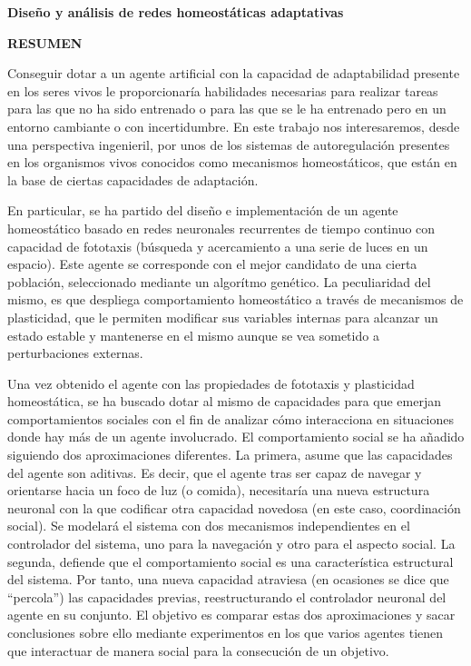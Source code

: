 \begin{center}
{\Large \bfseries Diseño y análisis de redes homeostáticas adaptativas}

\vspace{1cm}
{\Large \bfseries RESUMEN}

\vspace{1.5cm}
\end{center}

Conseguir dotar a un agente artificial con la capacidad de adaptabilidad presente en los seres vivos le proporcionaría habilidades necesarias para realizar tareas para las que no ha sido entrenado o
para las que se le ha entrenado pero en un entorno cambiante o con incertidumbre. En este trabajo nos interesaremos, desde una perspectiva ingenieril, por unos de los sistemas de autoregulación presentes
en los organismos vivos conocidos como mecanismos homeostáticos, que están en la base de ciertas capacidades de adaptación.

En particular, se ha partido del diseño e implementación de un agente homeostático basado en redes neuronales recurrentes de tiempo continuo con capacidad de fototaxis (búsqueda y acercamiento a una serie de luces en un espacio).
Este agente se corresponde con el mejor candidato de una cierta población, seleccionado mediante un algorítmo genético. La peculiaridad del mismo, es que despliega comportamiento homeostático a través de mecanismos de plasticidad,
que le permiten modificar sus variables internas para alcanzar un estado estable y mantenerse en el mismo aunque se vea sometido a perturbaciones externas.

Una vez obtenido el agente con las propiedades de fototaxis y plasticidad homeostática, se ha buscado dotar al mismo de capacidades para que emerjan comportamientos sociales con el fin de analizar cómo interacciona en situaciones donde hay más de un agente
involucrado. El comportamiento social se ha añadido siguiendo dos aproximaciones diferentes. La primera, asume que las capacidades del agente son aditivas. Es decir, que el agente tras ser capaz de navegar y orientarse
hacia un foco de luz (o comida), necesitaría una nueva estructura neuronal con la que codificar otra capacidad novedosa (en este caso, coordinación social). Se modelará el sistema con dos mecanismos independientes en el controlador
del sistema, uno para la navegación y otro para el aspecto social. La segunda, defiende que el comportamiento social es una característica estructural del sistema. Por tanto, una nueva capacidad atraviesa (en ocasiones se
dice que ``percola'') las capacidades previas, reestructurando el controlador neuronal del agente en su conjunto. El objetivo es comparar estas dos aproximaciones y sacar conclusiones sobre ello mediante experimentos en los que
varios agentes tienen que interactuar de manera social para la consecución de un objetivo.
